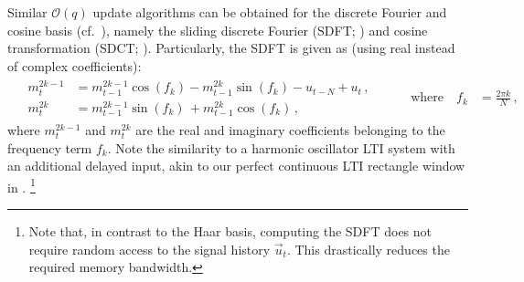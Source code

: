Similar $\mathcal{O}(q)$ update algorithms can be obtained for the discrete Fourier and cosine basis (cf.~), namely the sliding discrete Fourier (SDFT; \cite{springer1991sliding,jacobsen2003sliding}) and cosine transformation (SDCT; \cite{kober2004fast}).
Particularly, the SDFT is given as (using real instead of complex coefficients):
\begin{align}
	&\begin{aligned}
		m^{2k - 1}_t &= m^{2k -1}_{t - 1} \cos(f_k) - m^{2k}_{t - 1} \sin(f_k) - u_{t - N} + u_{t}\,, \\
		m^{2k}_t &= m^{2k - 1}_{t - 1}    \sin(f_k) \, + m^{2k}_{t - 1} \cos(f_k) \,,
	\end{aligned} & \quad\quad \text{where} \quad f_k &= \frac{2 \pi k}{N} \,,
	\label{eqn:sdft}
\end{align}
where $m_t^{2k - 1}$ and $m_t^{2k}$ are the real and imaginary coefficients belonging to the frequency term $f_k$.
Note the similarity to a harmonic oscillator LTI system with an additional delayed input, akin to our perfect continuous LTI rectangle window in .%
\footnote{Note that, in contrast to the Haar basis, computing the SDFT does not require random access to the signal history $\vec u_t$. This drastically reduces the required memory bandwidth.}

\newcommand{\symLTI}{\texttt{[image: media/chapters/04\_temporal\_tuning/04\_04/sym\_lti.pdf]}}
\newcommand{\symSDT}{\texttt{[image: media/chapters/04\_temporal\_tuning/04\_04/sym\_sdt.pdf]}}
\newcommand{\symFIR}{\texttt{[image: media/chapters/04\_temporal\_tuning/04\_04/sym\_fir.pdf]}}

